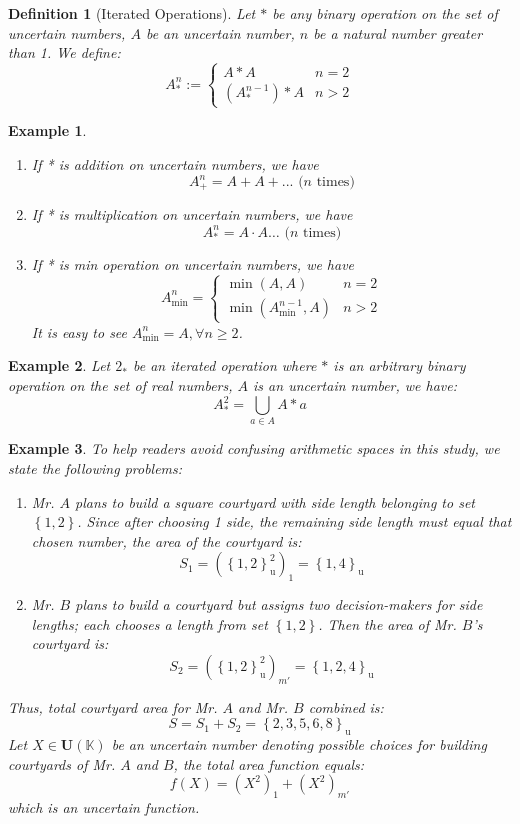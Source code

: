 \documentclass[a4paper,12pt,twoside]{memoir}
\newtheorem{definition}{Definition}[chapter]
\newtheorem{example}{Example}[chapter]
\newcommand{\set}[1]{\left\{#1\right\}} %
\newcommand{\s}[1]{\set{#1}_\mathrm{u}} %
\newcommand{\tsbd}[1]{\mathbf{U}(\mathbb{#1})}
\newcommand{\kgdd}[1]{\left(#1\right)_1} %
\newcommand{\kgdtmr}[1]{\left(#1\right)_{m'}} %
\begin{document}
	\begin{definition}[Iterated Operations]
		Let $*$ be any binary operation on the set of uncertain numbers, $A$ be an uncertain number, $n$ be a natural number greater than 1. We define:
		$$A^{n}_{*} := \begin{cases}
			A*A                        & n=2    \\
			\left(A^{n-1}_*\right) * A & n > 2
		\end{cases}$$
	\end{definition}
	
	\begin{example}
		\begin{enumerate}[leftmargin=*]
			\item If * is addition on uncertain numbers, we have
			$$A^n_+ = A+A+... \text{ ($n$ times)}$$
			\item If * is multiplication on uncertain numbers, we have
			$$A^n_* = A \cdot A \dots \text{ ($n$ times)}$$
			\item If * is min operation on uncertain numbers, we have
			$$A^n_{\min} = \begin{cases}
				\min(A,A)                          & n=2    \\
				\min\left(A^{n-1}_{\min}, A\right) & n > 2
			\end{cases}$$
			It is easy to see $A^n_{\min} = A, \forall n \geq 2$.
		\end{enumerate}
	\end{example}
	\begin{example}
		Let $2_*$ be an iterated operation where $*$ is an arbitrary binary operation on the set of real numbers, $A$ is an uncertain number, we have:
		\[A^2_* = \bigcup_{a \in A} A * a \]
	\end{example}
	
	\begin{example}
		To help readers avoid confusing arithmetic spaces in this study, we state the following problems:
		\begin{enumerate}[leftmargin=*]
			\item Mr. $A$ plans to build a square courtyard with side length belonging to set $\set{1,2}$. Since after choosing 1 side, the remaining side length must equal that chosen number, the area of the courtyard is:
			\[S_1 = \kgdd{\s{1,2}^2} = \s{1,4}\]
			\item Mr. $B$ plans to build a courtyard but assigns two decision-makers for side lengths; each chooses a length from set $\set{1,2}$. Then the area of Mr. $B$'s courtyard is:
			\[S_2 = \kgdtmr{\s{1,2}^2} =\s{1,2,4}\]
		\end{enumerate}
		Thus, total courtyard area for Mr. $A$ and Mr. $B$ combined is:
		\[S= S_1 + S_2 = \s{2, 3, 5, 6, 8}\]
		Let $X \in \tsbd{K}$ be an uncertain number denoting possible choices for building courtyards of Mr. $A$ and $B$, the total area function equals:
		\[f(X) = \kgdd{X^2} + \kgdtmr{X^2}\]
		which is an uncertain function.
	\end{example}
	
\end{document}
